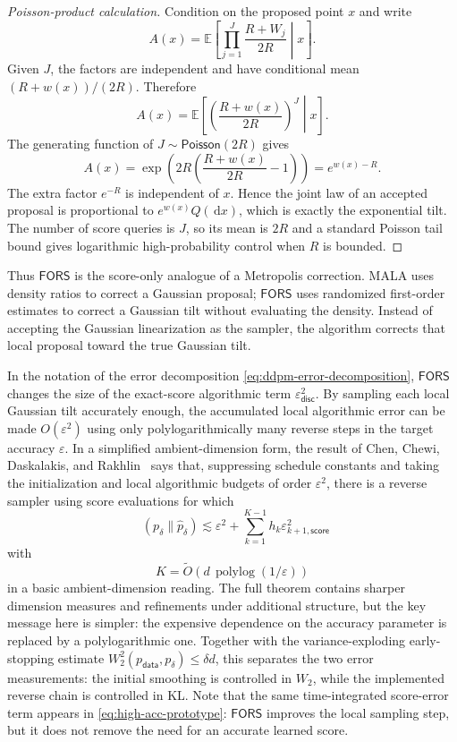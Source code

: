 \documentclass{amsart}
\numberwithin{equation}{section}
\theoremstyle{plain}
\theoremstyle{definition}
\theoremstyle{remark}
\DeclareMathOperator{\KL}{D_{\mathsf{KL}}}
\DeclareMathOperator{\polylog}{polylog}
\newcommand{\E}{\mathbb{E}}
\newcommand{\dd}{\,\mathrm{d}}
\newcommand{\wh}[1]{\widehat{#1}}
\newcommand{\eps}{\varepsilon}
\newcommand{\pdata}{p_{\mathsf{data}}}
\newcommand{\epsdisc}{\varepsilon_{\mathsf{disc}}}
\newcommand{\Poi}{\mathsf{Poisson}}
\newcommand{\tO}{\widetilde O}
\newcommand{\AlgFORS}{\textsf{FORS}}
\begin{document}
\begin{proof}[Poisson-product calculation]
Condition on the proposed point $x$ and write
\[
    A(x)
    =
    \E\left[
    \prod_{j=1}^{J}\frac{R+W_j}{2R}
    \middle| x
    \right].
\]
Given $J$, the factors are independent and have conditional mean
$(R+w(x))/(2R)$.  Therefore
\[
    A(x)
    =
    \E\left[
    \left(\frac{R+w(x)}{2R}\right)^J
    \middle| x
    \right].
\]
The generating function of $J\sim\Poi(2R)$ gives
\[
    A(x)
    =
    \exp\!\left(2R\left(\frac{R+w(x)}{2R}-1\right)\right)
    =
    e^{w(x)-R}.
\]
The extra factor $e^{-R}$ is independent of $x$.  Hence the joint law of an
accepted proposal is proportional to $e^{w(x)}Q(\dd x)$, which is exactly the
exponential tilt.  The number of score queries is $J$, so its mean is $2R$ and a
standard Poisson tail bound gives logarithmic high-probability control when
$R$ is bounded.
\end{proof}

Thus $\AlgFORS$ is the score-only analogue of a Metropolis correction.  MALA
uses density ratios to correct a Gaussian proposal; $\AlgFORS$ uses randomized
first-order estimates to correct a Gaussian tilt without evaluating the
density.  Instead of accepting the Gaussian linearization as the sampler, the
algorithm corrects that local proposal toward the true Gaussian tilt.

In the notation of the error decomposition \eqref{eq:ddpm-error-decomposition}, $\AlgFORS$
changes the size of the exact-score algorithmic term
$\epsdisc^2$.  By sampling each local Gaussian tilt accurately
enough, the accumulated local algorithmic error can be made $O(\eps^2)$
using only polylogarithmically many reverse steps in the target accuracy
$\eps$.  In a simplified ambient-dimension form, the result of Chen,
Chewi, Daskalakis, and Rakhlin~\cite{chen2026highaccuracy} says that,
suppressing schedule constants and taking the initialization and local
algorithmic budgets of order $\eps^2$, there is a reverse sampler using
score evaluations for which
\begin{equation}\label{eq:high-acc-prototype}
    \KL(p_\delta\|\wh p_\delta)
    \lesssim
    \eps^2
    +
    \sum_{k=1}^{K-1}
    h_k\eps_{k+1,\mathsf{score}}^2
\end{equation}
with
\[
    K
    =
    \tO\!\left(d\,\polylog(1/\eps)\right)
\]
in a basic ambient-dimension reading.  The full theorem contains sharper
dimension measures and refinements under additional structure, but the key
message here is simpler: the expensive dependence on the accuracy parameter is
replaced by a polylogarithmic one.  Together with the variance-exploding
early-stopping estimate $W_2^2(\pdata,p_\delta)\leq \delta d$, this separates
the two error measurements: the initial smoothing is controlled in $W_2$, while
the implemented reverse chain is controlled in KL\@.
Note that the same
time-integrated score-error term appears in \eqref{eq:high-acc-prototype}:
$\AlgFORS$ improves the local sampling step, but it does not remove the need
for an accurate learned score.
\end{document}
